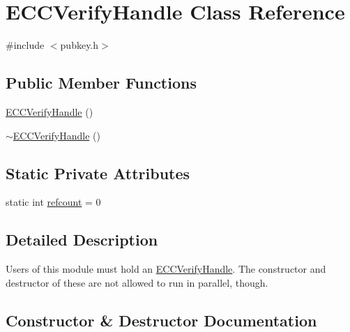 \hypertarget{class_e_c_c_verify_handle}{}\section{E\+C\+C\+Verify\+Handle Class Reference}
\label{class_e_c_c_verify_handle}


{\ttfamily \#include $<$pubkey.\+h$>$}

\subsection*{Public Member Functions}
\begin{DoxyCompactItemize}
\item 
\mbox{\hyperlink{class_e_c_c_verify_handle_a01404b41eee891c1dea4b58db02e56fb}{E\+C\+C\+Verify\+Handle}} ()
\item 
\mbox{\hyperlink{class_e_c_c_verify_handle_a17dea6c87a0f825f0f24a06a20e2baf9}{$\sim$\+E\+C\+C\+Verify\+Handle}} ()
\end{DoxyCompactItemize}
\subsection*{Static Private Attributes}
\begin{DoxyCompactItemize}
\item 
static int \mbox{\hyperlink{class_e_c_c_verify_handle_a5dcdd8e40cc4aed9ed7c67e4f400e51d}{refcount}} = 0
\end{DoxyCompactItemize}


\subsection{Detailed Description}
Users of this module must hold an \mbox{\hyperlink{class_e_c_c_verify_handle}{E\+C\+C\+Verify\+Handle}}. The constructor and destructor of these are not allowed to run in parallel, though. 

\subsection{Constructor \& Destructor Documentation}
\mbox{\label{class_e_c_c_verify_handle_a01404b41eee891c1dea4b58db02e56fb}} 
